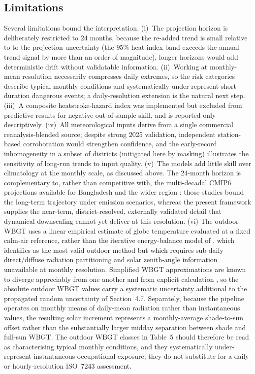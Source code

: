 \documentclass[pdflatex,sn-basic,lineno]{sn-jnl}
\begin{document}
\subsection{Limitations}
Several limitations bound the interpretation. (i)~The projection horizon is
deliberately restricted to 24 months, because the re-added trend is small relative to
to the projection uncertainty (the $95\%$ heat-index band exceeds the annual
trend signal by more than an order of magnitude), longer horizons would add
deterministic drift without validatable information. (ii)~Working at monthly-mean
resolution necessarily compresses daily extremes, so the risk categories describe
typical monthly conditions and systematically under-represent short-duration
dangerous events; a daily-resolution extension is the natural next step.
(iii)~A composite heatstroke-hazard index was implemented but excluded from
predictive results for negative out-of-sample skill, and is reported only
descriptively. (iv)~All meteorological inputs derive from a single commercial
reanalysis-blended source; despite strong 2025 validation, independent
station-based corroboration would strengthen confidence, and the early-record
inhomogeneity in a subset of districts (mitigated here by masking) illustrates the
sensitivity of long-run trends to input quality. (v)~The models add little skill
over climatology at the monthly scale, as discussed above. The 24-month horizon is
complementary to, rather than competitive with, the multi-decadal CMIP6 projections
available for Bangladesh and the wider region \citep{khatun2024,kushwaha2026humidex}:
those studies bound the long-term trajectory under emission scenarios, whereas the
present framework supplies the near-term, district-resolved, externally validated
detail that dynamical downscaling cannot yet deliver at this resolution. (vi) The outdoor WBGT uses a linear empirical estimate of globe temperature evaluated at a fixed calm-air reference, rather than the iterative energy-balance model of \citet{liljegren2008}, which \citet{lemke2012} identifies as the most valid outdoor method but which requires sub-daily direct/diffuse radiation partitioning and solar
zenith-angle information unavailable at monthly resolution. Simplified WBGT approximations are known to diverge appreciably from one another and from explicit calculation \citep{kong2022}, so the absolute outdoor WBGT values carry a systematic uncertainty additional to the propagated random uncertainty of Section~4.7. Separately, because the pipeline operates on monthly means of daily-mean radiation rather than instantaneous values, the resulting solar increment represents a monthly-average shade-to-sun offset rather than the substantially larger midday separation between shade and full-sun WBGT. The outdoor WBGT classes in Table~5 should
therefore be read as characterising typical monthly conditions, and they systematically under-represent instantaneous occupational exposure; they do not substitute for a daily- or hourly-resolution ISO~7243 assessment.
\end{document}

